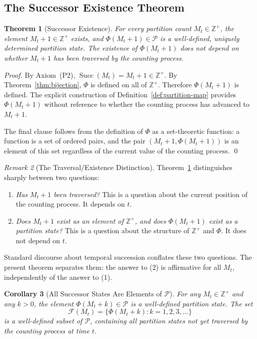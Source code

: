 \documentclass[twocolumn,10pt,a4paper]{article}
\theoremstyle{thmstyle}
\newtheorem{theorem}{Theorem}[section]
\newtheorem{corollary}[theorem]{Corollary}
\theoremstyle{definition}
\theoremstyle{remark}
\newtheorem{remark}[theorem]{Remark}
\DeclareMathOperator{\Succ}{Succ}
\newcommand{\Zp}{\mathbb{Z}^{+}}
\newcommand{\Parts}{\mathcal{P}}
\newcommand{\PhiMap}{\varPhi}
\begin{document}
\subsection{The Successor Existence Theorem}

\begin{theorem}[Successor Existence]
\label{thm:successor}
For every partition count $M_t \in \Zp$, the element $M_t + 1 \in \Zp$ exists, and $\PhiMap(M_t + 1) \in \Parts$ is a well-defined, uniquely determined partition state. The existence of $\PhiMap(M_t + 1)$ does not depend on whether $M_t + 1$ has been traversed by the counting process.
\end{theorem}

\begin{proof}
By Axiom~(P2), $\Succ(M_t) = M_t + 1 \in \Zp$. By Theorem~\ref{thm:bijection}, $\PhiMap$ is defined on all of $\Zp$. Therefore $\PhiMap(M_t + 1)$ is defined. The explicit construction of Definition~\ref{def:partition-map} provides $\PhiMap(M_t + 1)$ without reference to whether the counting process has advanced to $M_t + 1$.

The final clause follows from the definition of $\PhiMap$ as a set-theoretic function: a function is a set of ordered pairs, and the pair $(M_t + 1, \PhiMap(M_t + 1))$ is an element of this set regardless of the current value of the counting process. \qed
\end{proof}

\begin{remark}[The Traversal/Existence Distinction]
\label{rem:traversal}
Theorem~\ref{thm:successor} distinguishes sharply between two questions:
\begin{enumerate}[leftmargin=1.5em,itemsep=0.1em]
\item \emph{Has $M_t + 1$ been traversed?} This is a question about the current position of the counting process. It depends on $t$.
\item \emph{Does $M_t + 1$ exist as an element of $\Zp$, and does $\PhiMap(M_t + 1)$ exist as a partition state?} This is a question about the structure of $\Zp$ and $\PhiMap$. It does not depend on $t$.
\end{enumerate}
Standard discourse about temporal succession conflates these two questions. The present theorem separates them: the answer to (2) is affirmative for all $M_t$, independently of the answer to (1).
\end{remark}

\begin{corollary}[All Successor States Are Elements of $\Parts$]
\label{cor:all-successors}
For any $M_t \in \Zp$ and any $k > 0$, the element $\PhiMap(M_t + k) \in \Parts$ is a well-defined partition state. The set
\begin{equation}
    \mathcal{F}(M_t) = \{ \PhiMap(M_t + k) : k = 1, 2, 3, \ldots \}
\end{equation}
is a well-defined subset of $\Parts$, containing all partition states not yet traversed by the counting process at time $t$.
\end{corollary}
\end{document}
